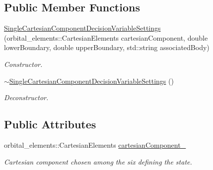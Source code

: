 \subsection*{Public Member Functions}
\begin{DoxyCompactItemize}
\item 
\hyperlink{structtudat_1_1optimization_1_1SingleCartesianComponentDecisionVariableSettings_a9ba9bffc7452d38c6eaf5448d2e79102}{Single\+Cartesian\+Component\+Decision\+Variable\+Settings} (orbital\+\_\+elements\+::\+Cartesian\+Elements cartesian\+Component, double lower\+Boundary, double upper\+Boundary, std\+::string associated\+Body)
\begin{DoxyCompactList}\small\item\em Constructor. \end{DoxyCompactList}\item 
\hyperlink{structtudat_1_1optimization_1_1SingleCartesianComponentDecisionVariableSettings_a6bd98fb09d4fda52e596e348a5f9a90e}{$\sim$\+Single\+Cartesian\+Component\+Decision\+Variable\+Settings} ()\hypertarget{structtudat_1_1optimization_1_1SingleCartesianComponentDecisionVariableSettings_a6bd98fb09d4fda52e596e348a5f9a90e}{}\label{structtudat_1_1optimization_1_1SingleCartesianComponentDecisionVariableSettings_a6bd98fb09d4fda52e596e348a5f9a90e}

\begin{DoxyCompactList}\small\item\em Deconstructor. \end{DoxyCompactList}\end{DoxyCompactItemize}
\subsection*{Public Attributes}
\begin{DoxyCompactItemize}
\item 
orbital\+\_\+elements\+::\+Cartesian\+Elements \hyperlink{structtudat_1_1optimization_1_1SingleCartesianComponentDecisionVariableSettings_ad7433a97f3d896618b21917bd2a0a041}{cartesian\+Component\+\_\+}\hypertarget{structtudat_1_1optimization_1_1SingleCartesianComponentDecisionVariableSettings_ad7433a97f3d896618b21917bd2a0a041}{}\label{structtudat_1_1optimization_1_1SingleCartesianComponentDecisionVariableSettings_ad7433a97f3d896618b21917bd2a0a041}

\begin{DoxyCompactList}\small\item\em Cartesian component chosen among the six defining the state. \end{DoxyCompactList}\end{DoxyCompactItemize}


